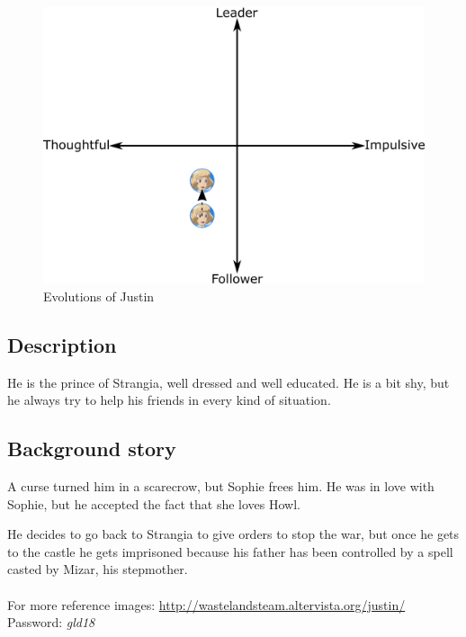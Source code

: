 \begin{figure}[H]
  \centering
   \includegraphics[width=14cm]{Images/Diagrams/Evolutions/justinEvolution}
  \caption{Evolutions of Justin}
\end{figure}

\subsection{Description}
He is the prince of Strangia, well dressed and well educated. He is a bit shy, but he always try to help his friends in every kind of situation.

\subsection{Background story}
A curse turned him in a scarecrow, but Sophie frees him. He was in love with Sophie, but he accepted the fact that she loves Howl.

He decides to go back to Strangia to give orders to stop the war, but once he gets to the castle he gets imprisoned because his father has been controlled by a spell casted by Mizar, his stepmother.\\\\
For more reference images: \url{http://wastelandsteam.altervista.org/justin/}\\
Password: \textit{gld18}
